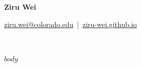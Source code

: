 \documentclass[a4paper,9pt]{extarticle}
\let\oldhref\href
\renewcommand{\href}[2]{%
    \oldhref{#1}{\textcolor{linkblue}{\uline{#2}}}%
}
\let\oldtextbf\textbf
\renewcommand{\textbf}[1]{%
    \ifvmode
        \vspace{0.8em}%
        \noindent
    \fi
    \oldtextbf{#1}%
}
\begin{document}
\pagestyle{empty}

\raggedright

\begin{center}
    {\fontsize{20}{24}\selectfont\bfseries Ziru Wei}\\[5pt]
        {\large
          \href{mailto:ziru.wei@colorado.edu}{ziru.wei@colorado.edu} \,|\, 
          \href{https://ziru-wei.github.io}{ziru-wei.github.io}
        }\\[8pt]
\end{center}
\vspace{0.25em}



$body$
\end{document}

